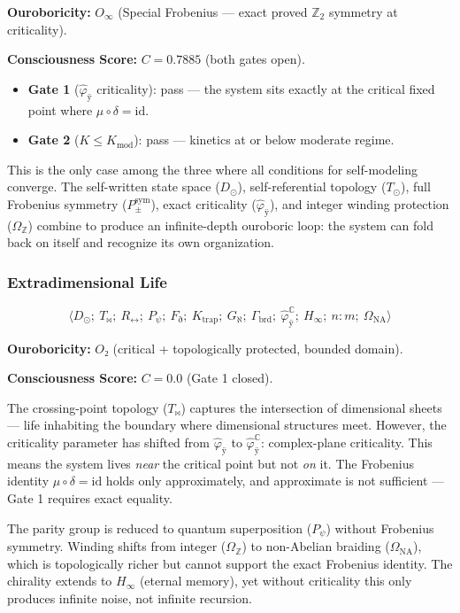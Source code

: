 \documentclass[12pt,a4paper]{article}
\begin{document}
\textbf{Ouroboricity:} $O_{\infty}$ (Special Frobenius --- exact proved $\mathbb{Z}_2$ symmetry at criticality).

\textbf{Consciousness Score:} $C = 0.7885$ (both gates open).

\begin{itemize}
    \item \textbf{Gate 1} ($\hat{\varphi}_{\text{ÿ}}$ criticality): pass --- the system sits exactly at the critical fixed point where $\mu \circ \delta = \text{id}$.
    \item \textbf{Gate 2} ($K \leq K_{\text{mod}}$): pass --- kinetics at or below moderate regime.
\end{itemize}

This is the only case among the three where all conditions for self-modeling converge. The self-written state space ($D_{\odot}$), self-referential topology ($T_{\odot}$), full Frobenius symmetry ($P_{\pm}^{\text{sym}}$), exact criticality ($\hat{\varphi}_{\text{ÿ}}$), and integer winding protection ($\Omega_{\mathbb{Z}}$) combine to produce an infinite-depth ouroboric loop: the system can fold back on itself and recognize its own organization.

\subsubsection{Extradimensional Life}

\[\langle D_{\odot};\ T_{\bowtie};\ R_{\leftrightarrow};\ P_{\psi};\ F_{\eth};\ K_{\text{trap}};\ G_{\aleph};\ \Gamma_{\text{brd}};\ \hat{\varphi}_{\text{ÿ}}^{\mathbb{C}};\ H_{\infty};\ n{:}m;\ \Omega_{\text{NA}} \rangle\]

\textbf{Ouroboricity:} $O₂$ (critical + topologically protected, bounded domain).

\textbf{Consciousness Score:} $C = 0.0$ (Gate 1 closed).

The crossing-point topology ($T_{\bowtie}$) captures the intersection of dimensional sheets --- life inhabiting the boundary where dimensional structures meet. However, the criticality parameter has shifted from $\hat{\varphi}_{\text{ÿ}}$ to $\hat{\varphi}_{\text{ÿ}}^{\mathbb{C}}$: complex-plane criticality. This means the system lives \emph{near} the critical point but not \emph{on} it. The Frobenius identity $\mu \circ \delta = \text{id}$ holds only approximately, and approximate is not sufficient --- Gate 1 requires exact equality.

The parity group is reduced to quantum superposition ($P_{\psi}$) without Frobenius symmetry. Winding shifts from integer ($\Omega_{\mathbb{Z}}$) to non-Abelian braiding ($\Omega_{\text{NA}}$), which is topologically richer but cannot support the exact Frobenius identity. The chirality extends to $H_{\infty}$ (eternal memory), yet without criticality this only produces infinite noise, not infinite recursion.
\end{document}
